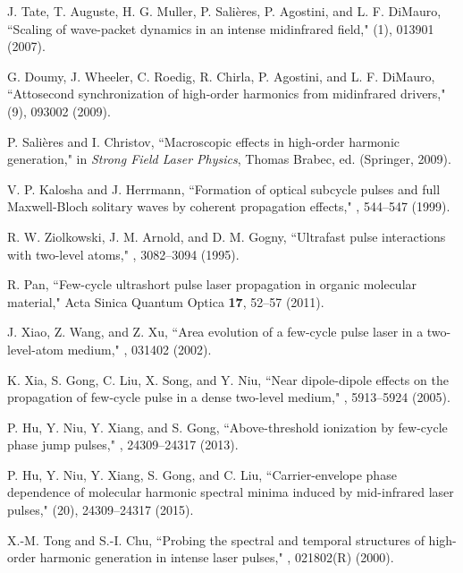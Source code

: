 \documentclass[10pt,letterpaper]{article}
\begin{document}
\begin{thebibliography}{99}
J. Tate, T. Auguste, H. G. Muller, P. Sali\`{e}res, P. Agostini, and L. F. DiMauro, ``Scaling of wave-packet dynamics in an intense midinfrared field," (1), 013901 (2007).

G. Doumy, J. Wheeler, C. Roedig, R. Chirla, P. Agostini, and L. F. DiMauro, ``Attosecond synchronization of high-order harmonics from midinfrared drivers," (9), 093002 (2009).

P. Sali\`{e}res and I. Christov, ``Macroscopic effects in high-order harmonic generation," in \emph{Strong Field Laser Physics}, Thomas Brabec, ed. (Springer, 2009).

V. P. Kalosha and J. Herrmann, ``Formation of optical subcycle pulses and full Maxwell-Bloch solitary waves by coherent propagation effects," , 544--547 (1999).

R. W. Ziolkowski, J. M. Arnold, and D. M. Gogny, ``Ultrafast pulse interactions with two-level atoms," , 3082--3094 (1995).


R. Pan, ``Few-cycle ultrashort pulse laser propagation in organic molecular material," Acta Sinica Quantum Optica {\bf 17}, 52--57 (2011).

J. Xiao, Z. Wang, and Z. Xu, ``Area evolution of a few-cycle pulse laser in a two-level-atom medium," , 031402 (2002).

K. Xia, S. Gong, C. Liu, X. Song, and Y. Niu, ``Near dipole-dipole effects on the propagation of few-cycle pulse in a dense two-level medium," , 5913--5924 (2005).


P. Hu, Y. Niu, Y. Xiang, and S. Gong, ``Above-threshold ionization by few-cycle phase jump pulses," , 24309--24317 (2013).

P. Hu, Y. Niu, Y. Xiang, S. Gong, and C. Liu, ``Carrier-envelope phase dependence of molecular harmonic spectral minima induced by mid-infrared laser pulses," (20), 24309--24317 (2015).

X.-M. Tong and S.-I. Chu, ``Probing the spectral and temporal structures of high-order harmonic generation in intense laser pulses," , 021802(R) (2000).


\end{thebibliography}
\end{document}
